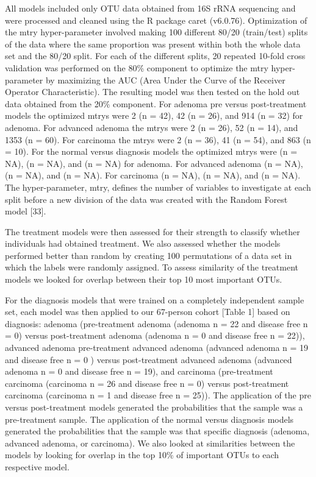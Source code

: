 \documentclass[12pt,]{article}
\begin{document}
All models included only OTU data obtained from 16S rRNA sequencing and
were processed and cleaned using the R package caret (v6.0.76).
Optimization of the mtry hyper-parameter involved making 100 different
80/20 (train/test) splits of the data where the same proportion was
present within both the whole data set and the 80/20 split. For each of
the different splits, 20 repeated 10-fold cross validation was performed
on the 80\% component to optimize the mtry hyper-parameter by maximizing
the AUC (Area Under the Curve of the Receiver Operator Characteristic).
The resulting model was then tested on the hold out data obtained from
the 20\% component. For adenoma pre versus post-treatment models the
optimized mtrys were 2 (n = 42), 42 (n = 26), and 914 (n = 32) for
adenoma. For advanced adenoma the mtrys were 2 (n = 26), 52 (n = 14),
and 1353 (n = 60). For carcinoma the mtrys were 2 (n = 36), 41 (n = 54),
and 863 (n = 10). For the normal versus diagnosis models the optimized
mtrys were (n = NA), (n = NA), and (n = NA) for adenoma. For advanced
adenoma (n = NA), (n = NA), and (n = NA). For carcinoma (n = NA), (n =
NA), and (n = NA). The hyper-parameter, mtry, defines the number of
variables to investigate at each split before a new division of the data
was created with the Random Forest model {[}33{]}.

The treatment models were then assessed for their strength to classify
whether individuals had obtained treatment. We also assessed whether the
models performed better than random by creating 100 permutations of a
data set in which the labels were randomly assigned. To assess
similarity of the treatment models we looked for overlap between their
top 10 most important OTUs.

For the diagnosis models that were trained on a completely independent
sample set, each model was then applied to our 67-person cohort {[}Table
1{]} based on diagnosis: adenoma (pre-treatment adenoma (adenoma n = 22
and disease free n = 0) versus post-treatment adenoma (adenoma n = 0 and
disease free n = 22)), advanced adenoma pre-treatment advanced adenoma
(advanced adenoma n = 19 and disease free n = 0 ) versus post-treatment
advanced adenoma (advanced adenoma n = 0 and disease free n = 19), and
carcinoma (pre-treatment carcinoma (carcinoma n = 26 and disease free n
= 0) versus post-treatment carcinoma (carcinoma n = 1 and disease free n
= 25)). The application of the pre versus post-treatment models
generated the probabilities that the sample was a pre-treatment sample.
The application of the normal versus diagnosis models generated the
probabilities that the sample was that specific diagnosis (adenoma,
advanced adenoma, or carcinoma). We also looked at similarities between
the models by looking for overlap in the top 10\% of important OTUs to
each respective model.
\end{document}
